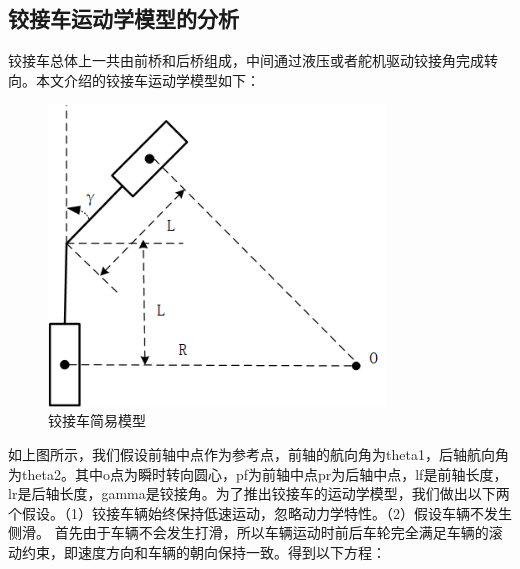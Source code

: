 \documentclass[master,academic]{ysuthesis} %
\begin{document}
		\subsection{铰接车运动学模型的分析}
		铰接车总体上一共由前桥和后桥组成，中间通过液压或者舵机驱动铰接角完成转向。本文介绍的铰接车运动学模型如下：  
		\begin{figure}[!ht]
			\centering
			\includegraphics[width=0.8\textwidth]{铰接车简易模型.png}
			\caption{铰接车简易模型}
			\label{fig:铰接车简易模型}
		\end{figure}
		如上图所示，我们假设前轴中点作为参考点，前轴的航向角为theta1，后轴航向角为theta2。其中o点为瞬时转向圆心，pf为前轴中点pr为后轴中点，lf是前轴长度，lr是后轴长度，gamma是铰接角。为了推出铰接车的运动学模型，我们做出以下两个假设。（1）铰接车辆始终保持低速运动，忽略动力学特性。（2）假设车辆不发生侧滑。
		首先由于车辆不会发生打滑，所以车辆运动时前后车轮完全满足车辆的滚动约束，即速度方向和车辆的朝向保持一致。得到以下方程：
		
\end{document}
